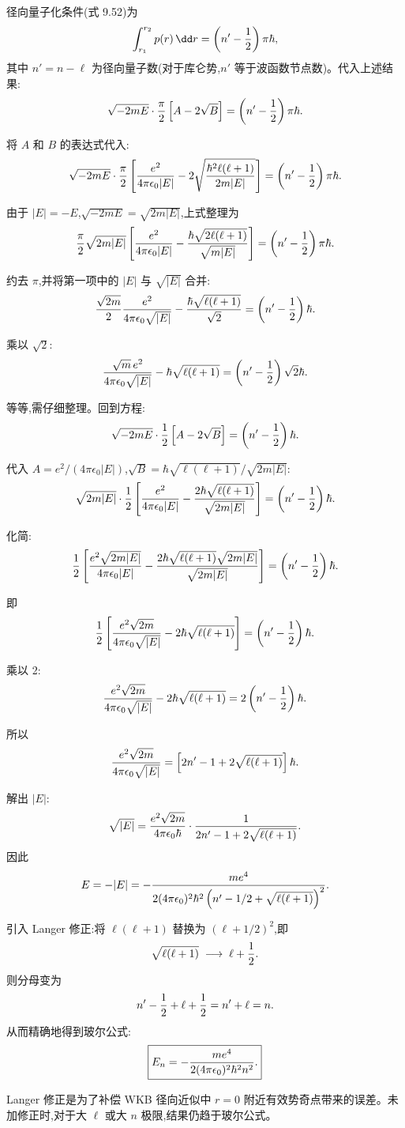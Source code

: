 \begin{question}
\begin{solution}
径向量子化条件(式 9.52)为
\[
\int_{r_1}^{r_2}p(r)\,\dd r=\left(n'-{1\over2}\right)\pi\hbar,
\]
其中 $n'=n-\ell$ 为径向量子数(对于库仑势,$n'$ 等于波函数节点数)。代入上述结果:
\[
\sqrt{-2mE}\cdot{\pi\over2}\left[A-2\sqrt{B}\right]
=\left(n'-{1\over2}\right)\pi\hbar.
\]

将 $A$ 和 $B$ 的表达式代入:
\[
\sqrt{-2mE}\cdot{\pi\over2}
\left[{e^2\over4\pi\epsilon_0|E|}-2\sqrt{\hbar^2\ell(\ell+1)\over2m|E|}\right]
=\left(n'-{1\over2}\right)\pi\hbar.
\]

由于 $|E|=-E$,$\sqrt{-2mE}=\sqrt{2m|E|}$,上式整理为
\[
{\pi\over2}\sqrt{2m|E|}
\left[{e^2\over4\pi\epsilon_0|E|}-{\hbar\sqrt{2\ell(\ell+1)}\over\sqrt{m|E|}}\right]
=\left(n'-{1\over2}\right)\pi\hbar.
\]

约去 $\pi$,并将第一项中的 $|E|$ 与 $\sqrt{|E|}$ 合并:
\[
{\sqrt{2m}\over2}{e^2\over4\pi\epsilon_0\sqrt{|E|}}
-{\hbar\sqrt{\ell(\ell+1)}\over\sqrt2}
=\left(n'-{1\over2}\right)\hbar.
\]

乘以 $\sqrt2$:
\[
{\sqrt{m}\,e^2\over4\pi\epsilon_0\sqrt{|E|}}
-\hbar\sqrt{\ell(\ell+1)}
=\left(n'-{1\over2}\right)\sqrt2\hbar.
\]

等等,需仔细整理。回到方程:
\[
\sqrt{-2mE}\cdot{1\over2}\left[A-2\sqrt{B}\right]
=\left(n'-{1\over2}\right)\hbar.
\]

代入 $A={e^2/(4\pi\epsilon_0|E|)}$,$\sqrt{B}={\hbar\sqrt{\ell(\ell+1)}/\sqrt{2m|E|}}$:
\[
\sqrt{2m|E|}\cdot{1\over2}
\left[{e^2\over4\pi\epsilon_0|E|}-{2\hbar\sqrt{\ell(\ell+1)}\over\sqrt{2m|E|}}\right]
=\left(n'-{1\over2}\right)\hbar.
\]

化简:
\[
{1\over2}\left[{e^2\sqrt{2m|E|}\over4\pi\epsilon_0|E|}
-{2\hbar\sqrt{\ell(\ell+1)}\sqrt{2m|E|}\over\sqrt{2m|E|}}\right]
=\left(n'-{1\over2}\right)\hbar.
\]

即
\[
{1\over2}\left[{e^2\sqrt{2m}\over4\pi\epsilon_0\sqrt{|E|}}
-2\hbar\sqrt{\ell(\ell+1)}\right]
=\left(n'-{1\over2}\right)\hbar.
\]

乘以 2:
\[
{e^2\sqrt{2m}\over4\pi\epsilon_0\sqrt{|E|}}
-2\hbar\sqrt{\ell(\ell+1)}
=2\left(n'-{1\over2}\right)\hbar.
\]

所以
\[
{e^2\sqrt{2m}\over4\pi\epsilon_0\sqrt{|E|}}
=\left[2n'-1+2\sqrt{\ell(\ell+1)}\right]\hbar.
\]

解出 $|E|$:
\[
\sqrt{|E|}={e^2\sqrt{2m}\over4\pi\epsilon_0\hbar}
\cdot{1\over2n'-1+2\sqrt{\ell(\ell+1)}}.
\]
因此
\[
E=-|E|=-{m e^4\over2(4\pi\epsilon_0)^2\hbar^2
\left(n'-1/2+\sqrt{\ell(\ell+1)}\right)^2}.
\]

引入 Langer 修正:将 $\ell(\ell+1)$ 替换为 $(\ell+1/2)^2$,即
\[
\sqrt{\ell(\ell+1)}\;\longrightarrow\;\ell+{1\over2}.
\]
则分母变为
\[
n'-{1\over2}+\ell+{1\over2}=n'+\ell=n.
\]
从而精确地得到玻尔公式:
\[
\boxed{E_n=-{m e^4\over2(4\pi\epsilon_0)^2\hbar^2 n^2}.}
\]

Langer 修正是为了补偿 WKB 径向近似中 $r=0$ 附近有效势奇点带来的误差。未加修正时,对于大 $\ell$ 或大 $n$ 极限,结果仍趋于玻尔公式。
\end{solution}
\end{question}

